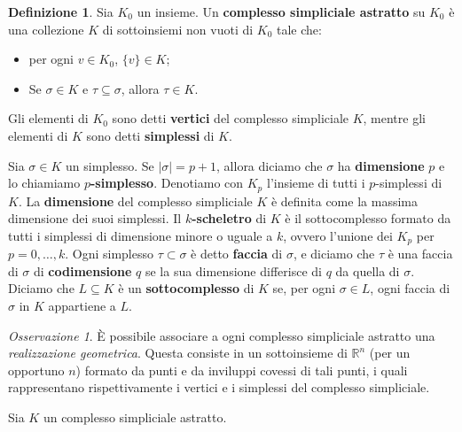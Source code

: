 \documentclass[a4paper, 12pt]{article}
\theoremstyle{definition}
\newtheorem{definition}{Definizione}[section]
\theoremstyle{remark}
\newtheorem{remark}[theorem]{Osservazione}
\begin{document}
\begin{definition}
    Sia $K_0$ un insieme. Un \textbf{complesso simpliciale astratto} su $K_0$ è una collezione $K$ di sottoinsiemi non vuoti di $K_0$ tale che:
    \begin{itemize}
        \item per ogni $v \in K_0$, $\{v\} \in K$;
        \item Se $\sigma \in K$ e $\tau \subseteq \sigma$, allora $\tau \in K$.
    \end{itemize}
\end{definition}
Gli elementi di $K_0$ sono detti \textbf{vertici} del complesso simpliciale $K$, mentre gli elementi di $K$ sono detti \textbf{simplessi} di $K$.

Sia $\sigma \in K$ un simplesso. Se $|\sigma| = p + 1$, allora diciamo che $\sigma$ ha \textbf{dimensione} $p$ e lo chiamiamo \textbf{$p$-simplesso}. Denotiamo con $K_p$ l'insieme di tutti i $p$-simplessi di $K$. La \textbf{dimensione} del complesso simpliciale $K$ è definita come la massima dimensione dei suoi simplessi. Il \textbf{$k$-scheletro} di $K$ è il sottocomplesso formato da tutti i simplessi di dimensione minore o uguale a $k$, ovvero l'unione dei $K_p$ per $p = 0 ,\dots, k$. Ogni simplesso $\tau \subset \sigma$ è detto \textbf{faccia} di $\sigma$, e diciamo che $\tau$ è una faccia di $\sigma$ di \textbf{codimensione} $q$ se la sua dimensione differisce di $q$ da quella di $\sigma$.
Diciamo che $L \subseteq K$ è un \textbf{sottocomplesso} di $K$ se, per ogni $\sigma \in L$, ogni faccia di $\sigma$ in $K$ appartiene a $L$.

\begin{remark}
    \`E possibile associare a ogni complesso simpliciale astratto una \textit{realizzazione geometrica}. Questa consiste in un sottoinsieme di $\mathbb{R}^n$ (per un opportuno $n$) formato da punti e da inviluppi covessi di tali punti, i quali rappresentano rispettivamente i vertici e i simplessi del complesso simpliciale.
\end{remark}

Sia $K$ un complesso simpliciale astratto.
\end{document}
